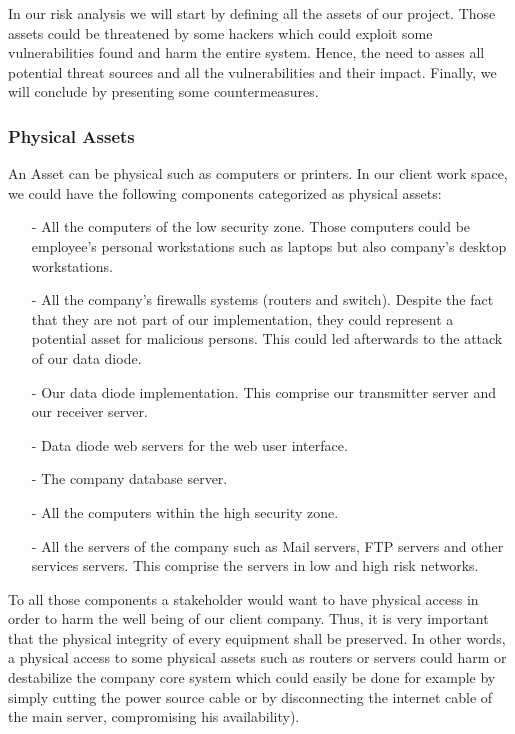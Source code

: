 \documentclass[a4paper,10pt]{article}
\begin{document}
In our risk analysis we will start by defining all the assets of our project. Those assets could be threatened by some hackers which could exploit some vulnerabilities found and harm the entire system. Hence, the need to asses all potential threat sources and all the vulnerabilities and their impact. Finally, we will conclude by presenting some countermeasures.

\subsubsection{Physical Assets}
An Asset can be physical such as computers or printers. In our client work space, we could have the following components categorized as physical assets:
\begin{enumerate}
\item[-] All the computers of the low security zone. Those computers could be employee's personal workstations such as laptops but also company's desktop workstations.
\item[-] All the company's firewalls systems (routers and switch). Despite the fact that they are not part of our implementation, they could represent a potential asset for malicious persons. This could led afterwards to the attack of our data diode.
\item[-] Our data diode implementation. This comprise our transmitter server and our receiver server.
\item[-] Data diode web servers for the web user interface.
\item[-] The company database server.
\item[-] All the computers within the high security zone.
\item[-] All the servers of the company such as Mail servers, FTP servers and other services servers. This comprise the servers in low and high risk networks.

\end{enumerate}
To all those components a stakeholder would want to have physical access in order to harm the well being of our client company. Thus, it is very important that the physical integrity of every equipment shall be preserved. In other words, a physical access to some physical assets such as routers or servers could harm or destabilize the company core system which could easily be done for example by simply cutting the power source cable or by disconnecting the internet cable of the main server, compromising his availability).
\end{document}
